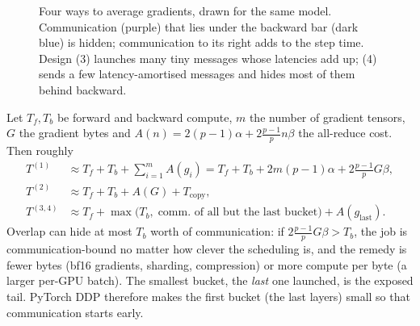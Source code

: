 \begin{figure}[t]
\centering
{}
\caption{Four ways to average gradients, drawn for the same model. Communication (purple) that
lies under the backward bar (dark blue) is hidden; communication to its right adds to the step
time. Design (3) launches many tiny messages whose latencies add up; (4) sends a few
latency-amortised messages and hides most of them behind backward.}
\label{fig:sharding:ddp}
\end{figure}

\begin{systemslens}
Let $T_f, T_b$ be forward and backward compute, $m$ the number of gradient tensors, $G$ the
gradient bytes and $A(n)=2(p-1)\alpha + 2\frac{p-1}{p}n\beta$ the all-reduce cost. Then roughly
\begin{align*}
T^{(1)} &\approx T_f + T_b + \textstyle\sum_{i=1}^{m} A(g_i) = T_f+T_b + 2m(p-1)\alpha + 2\tfrac{p-1}{p}G\beta,\\
T^{(2)} &\approx T_f + T_b + A(G) + T_\text{copy},\\
T^{(3,4)} &\approx T_f + \max\!\big(T_b,\; \text{comm. of all but the last bucket}\big) + A(g_\text{last}).
\end{align*}
Overlap can hide at most $T_b$ worth of communication: if $2\frac{p-1}{p}G\beta > T_b$, the job is
communication-bound no matter how clever the scheduling is, and the remedy is fewer bytes
(bf16 gradients, sharding, compression) or more compute per byte (a larger per-GPU batch). The
smallest bucket, the \emph{last} one launched, is the exposed tail. PyTorch DDP therefore makes
the first bucket (the last layers) small so that communication starts early.
\end{systemslens}

